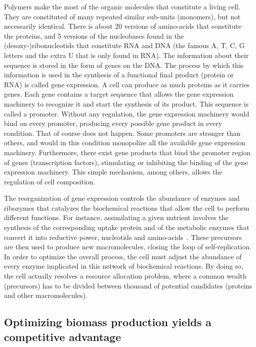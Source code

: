 Polymers make the most of the organic molecules that constitute a living cell.
They are constituted of many repeated similar sub-units (monomers), but not necessarily identical.
There is about 20 versions of amino-acids that constitute the proteins, and 5 versions of the nucleobases found in the (desoxy-)ribonucleotids that constitute RNA and DNA (the famous A, T, C, G letters and the extra U that is only found in RNA).
The information about their sequence is stored in the form of genes on the DNA.
The process by which this information is used in the synthesis of a functional final product (protein or RNA) is called gene expression.
A cell can produce as much proteins as it carries genes.
Each gene contains a target sequence that allows the gene expression machinery to recognize it and start the synthesis of its product.
This sequence is called a promoter.
Without any regulation, the gene expression machinery would bind on every promoter, producing every possible gene product in every condition.
That of course does not happen.
Some promoters are stronger than others, and would in this condition monopolize all the available gene expression machinery.
Furthermore, there exist gene products that bind the promoter region of genes (transcription factors), stimulating or inhibiting the binding of the gene expression machinery.
This simple mechanism, among others, allows the regulation of cell composition.

The reorganization of gene expression controls the abundance of enzymes and ribozymes that catalyzes the biochemical reactions that allow the cell to perform different functions.
For instance, assimilating a given nutrient involves the synthesis of the corresponding uptake protein and of the metabolic enzymes that convert it into reductive power, nucleotids and amino-acids~\cite{schaechter_microbe_2006}.
These precursors are then used to produce new macromolecules, closing the loop of self-replication.
In order to optimize the overall process, the cell must adjust the abundance of every enzyme implicated in this network of biochemical reactions.
By doing so, the cell actually resolves a resource allocation problem, where a common wealth (precursors) has to be divided between thousand of potential candidates (proteins and other macromolecules).

\subsection{Optimizing biomass production yields a competitive advantage}

